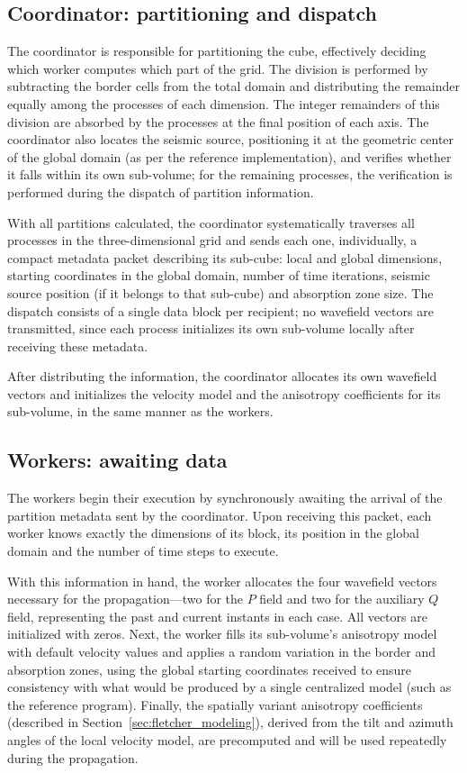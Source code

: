\documentclass[cic,tc,english]{infufrgs}
\begin{document}
\subsection{Coordinator: partitioning and dispatch}
The coordinator is responsible for partitioning the cube,
effectively deciding which worker computes which part of the grid.
The division is performed by subtracting the border cells from the
total domain and distributing the remainder equally among the processes
of each dimension. The integer remainders of this division are absorbed
by the processes at the final position of each axis.
The coordinator also locates the seismic source, positioning it at the
geometric center of the global domain (as per the reference
implementation), and verifies whether it falls within its own
sub-volume; for the remaining processes, the verification is performed
during the dispatch of partition information.

With all partitions calculated, the coordinator systematically
traverses all processes in the three-dimensional grid and sends each
one, individually, a compact metadata packet describing its sub-cube:
local and global dimensions, starting coordinates in the global
domain, number of time iterations, seismic source position (if it
belongs to that sub-cube) and absorption zone size. The dispatch
consists of a single data block per recipient; no wavefield vectors are
transmitted, since each process initializes its own sub-volume locally
after receiving these metadata.

After distributing the information, the coordinator allocates its own
wavefield vectors and initializes the velocity model and the
anisotropy coefficients for its sub-volume, in the same manner as the
workers.

\subsection{Workers: awaiting data}
The workers begin their execution by synchronously
awaiting the arrival of the partition metadata sent by the
coordinator. Upon receiving this packet, each worker knows exactly the
dimensions of its block, its position in the global domain and the
number of time steps to execute.

With this information in hand, the worker allocates the four wavefield
vectors necessary for the propagation---two for the $P$ field and two
for the auxiliary $Q$ field, representing the past and current instants
in each case. All vectors are initialized with zeros. Next, the worker
fills its sub-volume's anisotropy model with default velocity values
and applies a random variation in the border and absorption zones,
using the global starting coordinates received to ensure consistency
with what would be produced by a single centralized model (such as
the reference program). Finally, the spatially variant anisotropy
coefficients (described in Section~\ref{sec:fletcher_modeling}),
derived from the tilt and azimuth angles of the local velocity model,
are precomputed and will be used repeatedly during the propagation.
\end{document}
